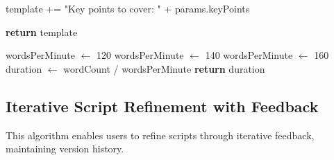 \begin{algorithm}[H]
\begin{algorithmic}[1]
        \State template += "Key points to cover: " + params.keyPoints
    \EndIf
    
    \State \textbf{return} template
\EndProcedure

        \State wordsPerMinute $\gets$ 120
        \State wordsPerMinute $\gets$ 140
    \Else {}
        \State wordsPerMinute $\gets$ 160
    \EndIf
    \State duration $\gets$ wordCount / wordsPerMinute
    \State \textbf{return} duration 
\EndProcedure
\end{algorithmic}
\end{algorithm}

\subsection{Iterative Script Refinement with Feedback}

This algorithm enables users to refine scripts through iterative feedback, maintaining version history.


